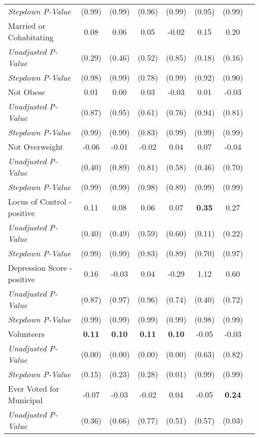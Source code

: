\begin{tabular}{l c c c c c c c}
\quad \textit{Stepdown P-Value} & (0.99) & (0.99) & (0.96) & (0.99) & (0.95) & (0.99) \\
Married or Cohabitating & 0.08 & 0.06 & 0.05 & -0.02 & 0.15 & 0.20 \\
\quad \textit{Unadjusted P-Value} & (0.29) & (0.46) & (0.52) & (0.85) & (0.18) & (0.16) \\
\quad \textit{Stepdown P-Value} & (0.98) & (0.99) & (0.78) & (0.99) & (0.92) & (0.90) \\
Not Obese & 0.01 & 0.00 & 0.03 & -0.03 & 0.01 & -0.03 \\
\quad \textit{Unadjusted P-Value} & (0.87) & (0.95) & (0.61) & (0.76) & (0.94) & (0.81) \\
\quad \textit{Stepdown P-Value} & (0.99) & (0.99) & (0.83) & (0.99) & (0.99) & (0.99) \\
Not Overweight & -0.06 & -0.01 & -0.02 & 0.04 & 0.07 & -0.04 \\
\quad \textit{Unadjusted P-Value} & (0.40) & (0.89) & (0.81) & (0.58) & (0.46) & (0.70) \\
\quad \textit{Stepdown P-Value} & (0.99) & (0.99) & (0.98) & (0.89) & (0.99) & (0.99) \\
Locus of Control - positive & 0.11 & 0.08 & 0.06 & 0.07 & \textbf{ 0.35 } & 0.27 \\
\quad \textit{Unadjusted P-Value} & (0.40) & (0.49) & (0.59) & (0.60) & (0.11) & (0.22) \\
\quad \textit{Stepdown P-Value} & (0.99) & (0.99) & (0.83) & (0.89) & (0.70) & (0.97) \\
Depression Score - positive & 0.16 & -0.03 & 0.04 & -0.29 & 1.12 & 0.60 \\
\quad \textit{Unadjusted P-Value} & (0.87) & (0.97) & (0.96) & (0.74) & (0.40) & (0.72) \\
\quad \textit{Stepdown P-Value} & (0.99) & (0.99) & (0.99) & (0.99) & (0.98) & (0.99) \\
Volunteers & \textbf{ 0.11 } & \textbf{ 0.10 } & \textbf{ 0.11 } & \textbf{ 0.10 } & -0.05 & -0.03 \\
\quad \textit{Unadjusted P-Value} & (0.00) & (0.00) & (0.00) & (0.00) & (0.63) & (0.82) \\
\quad \textit{Stepdown P-Value} & (0.15) & (0.23) & (0.28) & (0.01) & (0.99) & (0.99) \\
Ever Voted for Municipal & -0.07 & -0.03 & -0.02 & 0.04 & -0.05 & \textbf{ 0.24 } \\
\quad \textit{Unadjusted P-Value} & (0.36) & (0.66) & (0.77) & (0.51) & (0.57) & (0.03) \\

\end{tabular}
